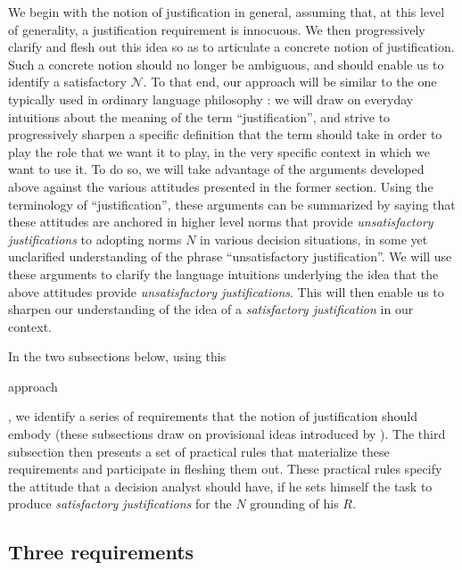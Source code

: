 \documentclass[preprint, french, english, 11pt, authoryear]{elsarticle}%
\newcommand{\adv}{\mathscr{N}}
\begin{document}
We begin with the notion of justification in general, assuming that, at this level of generality, a justification requirement is innocuous. 
We then progressively clarify and flesh out this idea so as to articulate a concrete notion of justification. Such a concrete notion should no longer be ambiguous, and should enable us to identify a satisfactory $\adv$. 
To that end, our approach will be similar to the one typically used in ordinary language philosophy \citep{soames_philosophical_2003}: 
we will draw on everyday intuitions about the meaning of the term ``justification'', and strive to progressively sharpen a specific definition that the term should take in order to play the role that we want it to play, in the very specific context in which we want to use it. 
To do so, we will take advantage of the arguments developed above against the various attitudes presented in the former section. 
Using the terminology of ``justification'', these arguments can be summarized by saying that these attitudes are anchored in higher level norms that provide \emph{unsatisfactory justifications} to adopting norms $N$ in various decision situations, 
in some yet unclarified understanding of the phrase ``unsatisfactory justification''. We will use these arguments to clarify the language intuitions underlying the idea that the above attitudes provide \emph{unsatisfactory justifications}. 
This will then enable us to sharpen our understanding of the idea of a \emph{satisfactory justification} in our context.

In the two subsections below, using this \begin{changebar}approach\end{changebar}, we identify a series of requirements that the notion of justification should embody (these subsections draw on provisional ideas introduced by \citet{meinard_du_2013, meinard_what_2017}). 
The third subsection then presents a set of practical rules that materialize these requirements and participate in fleshing them out. These practical rules specify the attitude that a decision analyst should have, if he sets himself the task to produce \emph{satisfactory justifications} for the $N$ grounding of his $R$.

\subsection{Three requirements}
\end{document}
